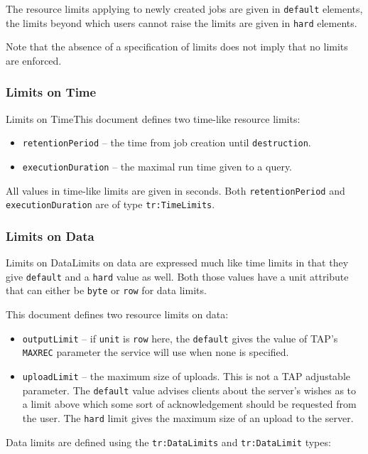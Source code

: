 \documentclass{ivoa}
\begin{document}
The resource limits applying to newly created jobs are given in
\texttt{default} elements, the limits beyond which users cannot
raise the limits are given in \texttt{hard} elements.

Note that the absence of a specification of limits does not imply that
no limits are enforced.


\subsubsection{Limits on Time}
Limits on TimeThis document defines two time-like resource limits:


\begin{itemize}

\item \texttt{retentionPeriod} -- the time from job creation until
		\texttt{destruction}.{}

\item \texttt{executionDuration} -- the maximal run time given to
		a query.{}

\end{itemize}
All values in time-like limits are given in seconds.  Both 
\texttt{retentionPeriod} and \texttt{executionDuration} are of type
\texttt{tr:TimeLimits}.


\subsubsection{Limits on Data}
Limits on DataLimits on data are expressed much like time limits in that they give
\texttt{default} and a \texttt{hard} value as well.  
Both those values have a unit attribute that can either be \texttt{byte}
or \texttt{row} for data limits.

This document defines two resource limits on data:


\begin{itemize}

\item \texttt{outputLimit} -- if \texttt{unit} is \texttt{row} here,
the \texttt{default} gives the
value of TAP's \texttt{MAXREC} parameter the service will use when none
is specified.{}

\item \texttt{uploadLimit} -- the maximum size of uploads.  This 
is not a TAP adjustable parameter.  The \texttt{default} value
advises clients about the server's wishes as to a limit above which
some sort of acknowledgement should be requested from the user.  The 
\texttt{hard} limit gives the maximum size of an upload to the 
server.{}

\end{itemize}
Data limits are defined using the \texttt{tr:DataLimits}
and \texttt{tr:DataLimit} types:
\end{document}
